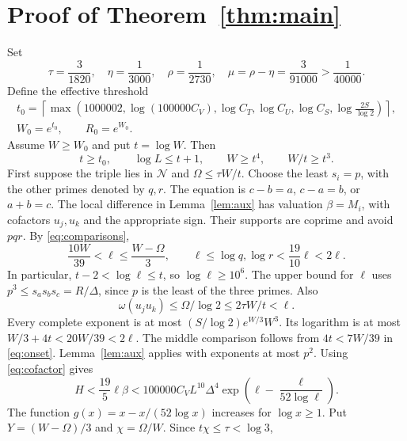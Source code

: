 \documentclass{amsart}
\theoremstyle{remark}
\numberwithin{equation}{section}
\begin{document}
\section{Proof of Theorem~\ref{thm:main}}\label{sec:proof}
Set
\begin{equation}\label{eq:rates}
\tau=\frac3{1820},\quad \eta=\frac1{3000},\quad
\rho=\frac1{2730},\quad \mu=\rho-\eta=\frac3{91000}>\frac1{40000}.
\end{equation}
Define the effective threshold
\begin{equation}\label{eq:threshold}
\begin{split}
t_0=\left\lceil\max\left(1000002,\log(100000C_V),\log C_T,
 \log C_U,\log C_S,\log\frac{2S}{\log2}\right)\right\rceil,\\
W_0=e^{t_0},\qquad R_0=e^{W_0}.
\end{split}
\end{equation}
Assume $W\ge W_0$ and put $t=\log W$.
Then
\begin{equation}\label{eq:onset}
t\ge t_0,\qquad\log L\le t+1,\qquad W\ge t^4,\qquad W/t\ge t^3.
\end{equation}
First suppose the triple lies in $\mathcal N$ and $\Omega\le\tau W/t$.
Choose the least $s_i=p$, with the other primes denoted by $q,r$.
The equation is $c-b=a$, $c-a=b$, or $a+b=c$.
The local difference in Lemma~\ref{lem:aux} has valuation $\beta=M_i$,
with cofactors $u_j,u_k$ and the appropriate sign.
Their supports are coprime and avoid $pqr$.
By \eqref{eq:comparisons},
\begin{equation}\label{eq:ellrange}
\frac{10W}{39}<\ell\le\frac{W-\Omega}3,\qquad
\ell\le\log q,\log r<\frac{19}{10}\ell<2\ell.
\end{equation}
In particular, $t-2<\log\ell\le t$, so $\log\ell\ge10^6$.
The upper bound for $\ell$ uses
$p^3\le s_as_bs_c=R/\Delta$, since $p$ is the least of the three primes.
Also
\[
\omega(u_ju_k)\le\Omega/\log2\le2\tau W/t<\ell.
\]
Every complete exponent is at most $(S/\log2)e^{W/3}W^3$.
Its logarithm is at most $W/3+4t<20W/39<2\ell$.
The middle comparison follows from $4t<7W/39$ in \eqref{eq:onset}.
Lemma~\ref{lem:aux} applies with exponents at most $p^2$.
Using \eqref{eq:cofactor} gives
\begin{equation}\label{eq:beforemonotone}
H<\frac{19}5\ell\beta
 <100000C_VL^{10}\Delta^4
       \exp\!\left(\ell-\frac{\ell}{52\log\ell}\right).
\end{equation}
The function $g(x)=x-x/(52\log x)$ increases for $\log x\ge1$.
Put $Y=(W-\Omega)/3$ and $\chi=\Omega/W$.
Since $t\chi\le\tau<\log3$,
\end{document}
